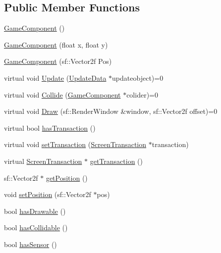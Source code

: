 \subsection*{Public Member Functions}
\begin{DoxyCompactItemize}
\item 
\hyperlink{class_game_component_a7109f4539ef3d4e92868298df54b7ecd}{Game\-Component} ()
\item 
\hyperlink{class_game_component_ac1eefc88d46d10f869939a7bab5a498b}{Game\-Component} (float x, float y)
\item 
\hyperlink{class_game_component_a3338305ddce8cb75296ba23e1c29cf0f}{Game\-Component} (sf\-::\-Vector2f Pos)
\item 
virtual void \hyperlink{class_game_component_a01b3434d7bf6a63552e7ea4fd68744fe}{Update} (\hyperlink{class_update_data}{Update\-Data} $\ast$updateobject)=0
\item 
virtual void \hyperlink{class_game_component_a333932780a30df552333d02669c593bc}{Collide} (\hyperlink{class_game_component}{Game\-Component} $\ast$colider)=0
\item 
virtual void \hyperlink{class_game_component_a63c3e40531340490712b789d0d821743}{Draw} (sf\-::\-Render\-Window \&window, sf\-::\-Vector2f offset)=0
\item 
virtual bool \hyperlink{class_game_component_a5dc0e3d5d8aa6be47d4392dc0ebe566d}{has\-Transaction} ()
\item 
virtual void \hyperlink{class_game_component_a5473b7d5e5c1e6f6c94e1d665cb4623c}{set\-Transaction} (\hyperlink{class_screen_transaction}{Screen\-Transaction} $\ast$transaction)
\item 
virtual \hyperlink{class_screen_transaction}{Screen\-Transaction} $\ast$ \hyperlink{class_game_component_a84b6f548c5045a179b9d2c33c3944f10}{get\-Transaction} ()
\item 
sf\-::\-Vector2f $\ast$ \hyperlink{class_game_component_aabb5e9e8ed6aa3a82f5d5b5733bf201c}{get\-Position} ()
\item 
void \hyperlink{class_game_component_ae1218b48879f706b5686bcedd4c51022}{set\-Position} (sf\-::\-Vector2f $\ast$pos)
\item 
bool \hyperlink{class_game_component_ae5a83de3b78cc5ce0f43316dd45de20d}{has\-Drawable} ()
\item 
bool \hyperlink{class_game_component_a8595ee50d296557bcf1af3ba5283c311}{has\-Collidable} ()
\item 
bool \hyperlink{class_game_component_af61ba1bd218ff2aca92443c89375c222}{has\-Sensor} ()

\end{DoxyCompactItemize}

